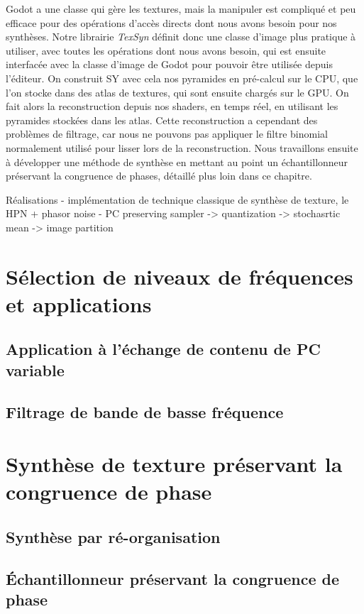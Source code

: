 Godot a une classe qui gère les textures, mais la manipuler est compliqué et peu efficace pour des opérations d'accès directs dont nous avons besoin pour nos synthèses. Notre librairie \textit{TexSyn} définit donc une classe d'image plus pratique à utiliser, avec toutes les opérations dont nous avons besoin, qui est ensuite interfacée avec la classe d'image de Godot pour pouvoir être utilisée depuis l'éditeur. On construit SY avec cela nos pyramides en pré-calcul sur le CPU, que l'on stocke dans des atlas de textures, qui sont ensuite chargés sur le GPU. On fait alors la reconstruction depuis nos shaders, en temps réel, en utilisant les pyramides stockées dans les atlas. Cette reconstruction a cependant des problèmes de filtrage, car nous ne pouvons pas appliquer le filtre binomial normalement utilisé pour lisser lors de la reconstruction. Nous travaillons ensuite à développer une méthode de synthèse en mettant au point un échantillonneur préservant la congruence de phases, détaillé plus loin dans ce chapitre.



Réalisations
- implémentation de technique classique de synthèse de texture, le HPN + phasor noise
- PC preserving sampler
    -> quantization
    -> stochasrtic mean
    -> image partition

\section{Sélection de niveaux de fréquences et applications}

\subsection{Application à l'échange de contenu de PC variable}

\subsection{Filtrage de bande de basse fréquence}

\section{Synthèse de texture préservant la congruence de phase}

\subsection{Synthèse par ré-organisation}

\subsection{Échantillonneur préservant la congruence de phase}